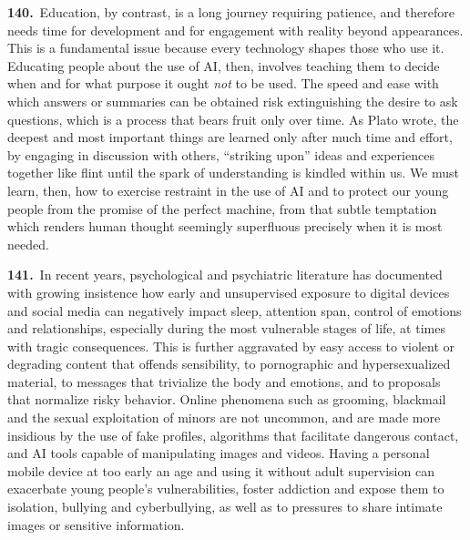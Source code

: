 \documentclass{article}
\begin{document}
\textbf{140.}\ Education, by contrast, is a long journey requiring patience, and therefore needs time for development and for engagement with reality beyond appearances. This is a fundamental issue because every technology shapes those who use it. Educating people about the use of AI, then, involves teaching them to decide when and for what purpose it ought \emph{not} to be used. The speed and ease with which answers or summaries can be obtained risk extinguishing the desire to ask questions, which is a process that bears fruit only over time. As Plato wrote, the deepest and most important things are learned only after much time and effort, by engaging in discussion with others, ``striking upon'' ideas and experiences together like flint until the spark of understanding is kindled within us.\cite{n147} We must learn, then, how to exercise restraint in the use of AI and to protect our young people from the promise of the perfect machine, from that subtle temptation which renders human thought seemingly superfluous precisely when it is most needed.

\textbf{141.}\ In recent years, psychological and psychiatric literature has documented with growing insistence how early and unsupervised exposure to digital devices and social media can negatively impact sleep, attention span, control of emotions and relationships, especially during the most vulnerable stages of life, at times with tragic consequences. This is further aggravated by easy access to violent or degrading content that offends sensibility, to pornographic and hypersexualized material, to messages that trivialize the body and emotions, and to proposals that normalize risky behavior. Online phenomena such as grooming, blackmail and the sexual exploitation of minors are not uncommon, and are made more insidious by the use of fake profiles, algorithms that facilitate dangerous contact, and AI tools capable of manipulating images and videos. Having a personal mobile device at too early an age and using it without adult supervision can exacerbate young people's vulnerabilities, foster addiction and expose them to isolation, bullying and cyberbullying, as well as to pressures to share intimate images or sensitive information.
\end{document}
